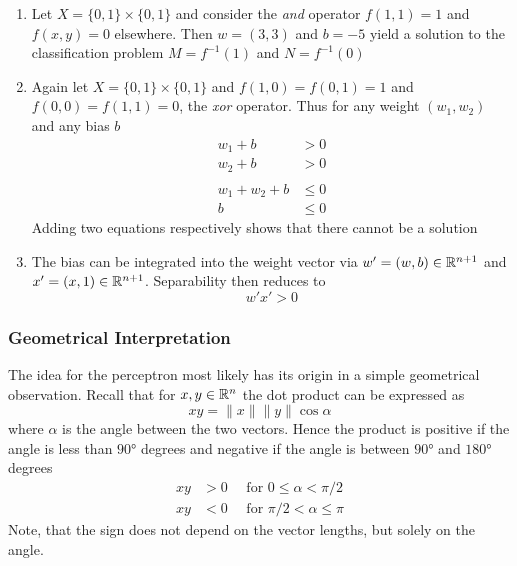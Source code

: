 \begin{examples}
    \hfill
    \begin{enumerate}
        \item Let \( X = \{ 0, 1 \} \times \{ 0, 1 \} \) and consider the \emph{and} operator
              \( f(1, 1) = 1 \) and \( f(x, y) = 0 \) elsewhere. Then \( w = (3, 3) \) and \( b = -5 \)
              yield a solution to the classification problem \( M = f^{-1}(1) \) and \( N = f^{-1}(0) \)
        \item Again let \( X = \{ 0, 1 \} \times \{ 0, 1 \} \) and \( f(1, 0) = f(0, 1) = 1 \) and
              \( f(0, 0) = f(1, 1) = 0 \), the \emph{xor} operator. Thus for any weight \( (w_1, w_2) \) and
              any bias \( b \)
              \[
                  \begin{split}
                      w_1 + b & > 0 \\
                      w_2 + b & > 0 \\
                      \\
                      w_1 + w_2 + b & \le 0 \\
                      b & \le 0
                  \end{split}
              \]
              Adding two equations respectively shows that there cannot be a solution
        \item The bias can be integrated into the weight vector via \( w' = (w, b) \in \mathbb{R}^{n + 1} \) and
              \( x' = (x, 1) \in \mathbb{R}^{n + 1} \). Separability then reduces to
              \[
                  w'x' > 0
              \]
    \end{enumerate}
\end{examples}
\bigskip


\subsubsection*{Geometrical Interpretation}
\bigskip
The idea for the perceptron most likely has its origin in a simple geometrical observation.
Recall that for \( x, y \in \mathbb{R}^n \) the dot product can be expressed as
\[
    xy = \|x\| \|y\| \cos\alpha
\]
where \( \alpha \) is the angle between the two vectors. Hence the product is positive
if the angle is less than \( \ang{90} \) degrees and negative if the angle is between \( \ang{90} \)
and \( \ang{180} \) degrees
\[
    \begin{split}
        xy & > 0 \hspace{1em}\text{ for } 0 \le \alpha < \pi / 2 \\
        xy & < 0 \hspace{1em}\text{ for } \pi / 2 < \alpha \le \pi
    \end{split}
\]
Note, that the sign does not depend on the vector lengths, but solely on the angle.

